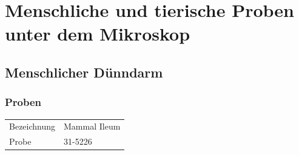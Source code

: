 \section{Menschliche und tierische Proben unter dem Mikroskop}

\newpage
\subsection{Menschlicher Dünndarm}

\subsubsection{Proben}
\begin{table}[h!]
	\centering
	\begin{tabular}{l l}
		Bezeichnung	& Mammal Ileum \\
		Probe 		& 31-5226
	\end{tabular}
\end{table}

